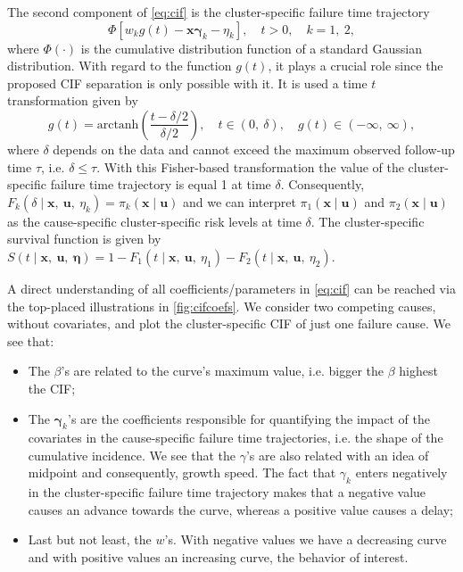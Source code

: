 \documentclass[a4paper,12pt]{article}
\begin{document}
The second component of \autoref{eq:cif} is the cluster-specific failure
time trajectory
\[
 \Phi[w_{k} g(t) - \bm{x}\bm{\gamma}_{k} - \eta_{k}],
 \quad t > 0, \quad k = 1,~2,
\]
where \(\Phi(\cdot)\) is the cumulative distribution function of a
standard Gaussian distribution. With regard to the function \(g(t)\), it
plays a crucial role since the proposed CIF separation is only possible
with it. It is used a time \(t\) transformation given by
\[
 g(t) = \text{arctanh}\left(\frac{t - \delta/2}{\delta/2}\right),
 \quad t\in(0,~\delta), \quad g(t)\in(-\infty,~\infty),
\]
where \(\delta\) depends on the data and cannot exceed the maximum
observed follow-up time \(\tau\), i.e. \(\delta \leq \tau\). With this
Fisher-based transformation the value of the cluster-specific failure
time trajectory is equal 1 at time \(\delta\). Consequently, \(F_{k}
(\delta \mid \bm{x},~\bm{u},~\eta_{k}) = \pi_{k}(\bm{x} \mid \bm{u})\)
and we can interpret \(\pi_{1}(\bm{x} \mid \bm{u})\) and
\(\pi_{2}(\bm{x} \mid \bm{u})\) as the cause-specific cluster-specific
risk levels at time \(\delta\). The cluster-specific survival function
is given by \(S(t \mid \bm{x},~\bm{u},~\bm{\eta}) = 1 - F_{1} (t \mid
\bm{x},~\bm{u},~\eta_{1}) - F_{2} (t \mid \bm{x},~\bm{u},~\eta_{2})\).

A direct understanding of all coefficients/parameters in
\autoref{eq:cif} can be reached via the top-placed illustrations in
\autoref{fig:cifcoefs}. We consider two competing causes, without
covariates, and plot the cluster-specific CIF of just one failure
cause. We see that:
\begin{itemize}
 \item The \(\beta\)'s are related to the curve's maximum value, i.e.
   bigger the \(\beta\) highest the CIF;

 \item The \(\bm{\gamma}_{k}\)'s are the coefficients responsible for
   quantifying the impact of the covariates in the cause-specific
   failure time trajectories, i.e. the shape of the cumulative
   incidence. We see that the \(\gamma\)'s are also related with an idea
   of midpoint and consequently, growth speed. The fact that
   \(\gamma_{k}\) enters negatively in the cluster-specific failure time
   trajectory makes that a negative value causes an advance towards the
   curve, whereas a positive value causes a delay;

 \item Last but not least, the \(w\)'s. With negative values we have a
   decreasing curve and with positive values an increasing curve, the
   behavior of interest.
\end{itemize}
   
\end{document}
